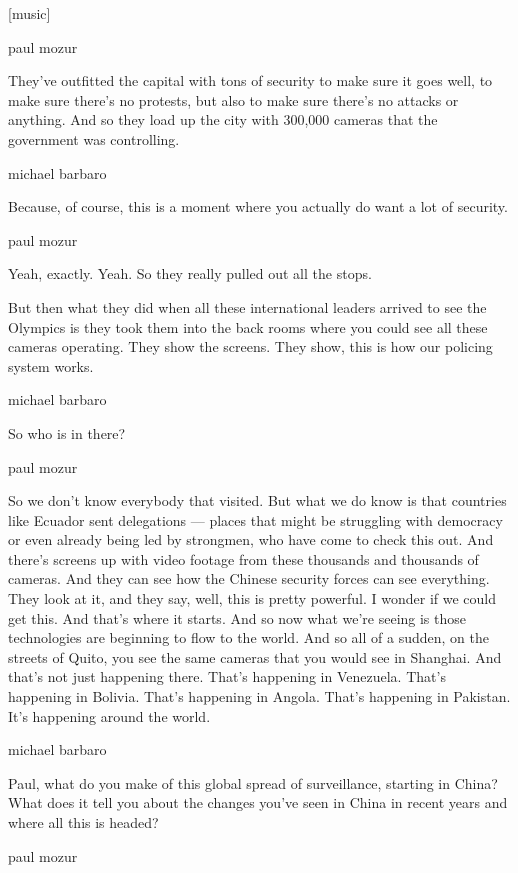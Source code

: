 {[}music{]}

paul mozur

They've outfitted the capital with tons of security to make sure it goes
well, to make sure there's no protests, but also to make sure there's no
attacks or anything. And so they load up the city with 300,000 cameras
that the government was controlling.

michael barbaro

Because, of course, this is a moment where you actually do want a lot of
security.

paul mozur

Yeah, exactly. Yeah. So they really pulled out all the stops.

But then what they did when all these international leaders arrived to
see the Olympics is they took them into the back rooms where you could
see all these cameras operating. They show the screens. They show, this
is how our policing system works.

michael barbaro

So who is in there?

paul mozur

So we don't know everybody that visited. But what we do know is that
countries like Ecuador sent delegations --- places that might be
struggling with democracy or even already being led by strongmen, who
have come to check this out. And there's screens up with video footage
from these thousands and thousands of cameras. And they can see how the
Chinese security forces can see everything. They look at it, and they
say, well, this is pretty powerful. I wonder if we could get this. And
that's where it starts. And so now what we're seeing is those
technologies are beginning to flow to the world. And so all of a sudden,
on the streets of Quito, you see the same cameras that you would see in
Shanghai. And that's not just happening there. That's happening in
Venezuela. That's happening in Bolivia. That's happening in Angola.
That's happening in Pakistan. It's happening around the world.

michael barbaro

Paul, what do you make of this global spread of surveillance, starting
in China? What does it tell you about the changes you've seen in China
in recent years and where all this is headed?

paul mozur

